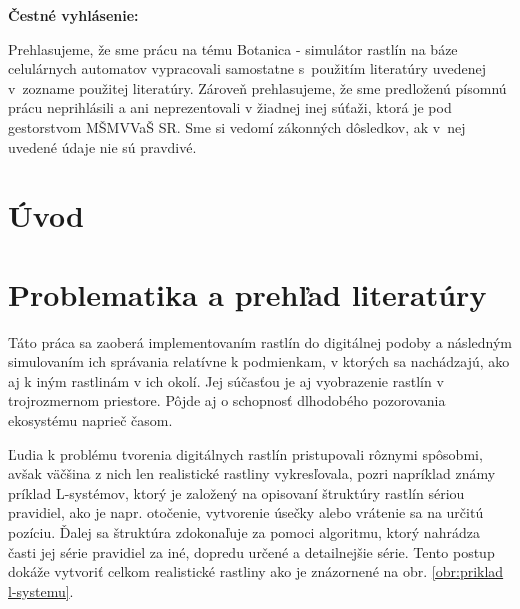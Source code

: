 \documentclass[12pt]{article}
\def\nazovprace{Botanica - simulátor rastlín na báze celulárnych automatov}
\begin{document}
\setcounter{page}{3}

%
%

\thispagestyle{empty}

\null
\vspace{4cm}

\noindent
\textbf{Čestné vyhlásenie:}

\noindent
Prehlasujeme, že sme prácu na tému
\nazovprace \space
vypracovali samostatne s~použitím literatúry uvedenej v~zozname použitej literatúry.
Zároveň prehlasujeme, že sme predloženú písomnú prácu neprihlásili a ani neprezentovali
v žiadnej inej súťaži, ktorá je pod gestorstvom MŠMVVaŠ SR. Sme si vedomí zákonných dôsledkov,
ak v~nej uvedené údaje nie sú pravdivé.

\newpage


%
%

% 
% 
% 
% 


%
%

\thispagestyle{empty}
\tableofcontents

%
%

\section*{Úvod}

\section{Problematika a prehľad literatúry}

Táto práca sa zaoberá implementovaním rastlín do digitálnej podoby a následným
simulovaním ich správania relatívne k podmienkam, v ktorých sa nachádzajú,
ako aj k iným rastlinám v ich okolí. Jej súčasťou je aj vyobrazenie
rastlín v trojrozmernom priestore. Pôjde aj o schopnosť dlhodobého
pozorovania ekosystému naprieč časom.

Ľudia k problému tvorenia digitálnych rastlín pristupovali rôznymi spôsobmi,
avšak väčšina z nich len realistické rastliny vykresľovala, pozri napríklad
známy príklad L-systémov, \cite{wiki:L-system}
ktorý je založený na opisovaní štruktúry rastlín
sériou pravidiel, ako je napr. otočenie, vytvorenie úsečky alebo
vrátenie sa na určitú pozíciu. Ďalej sa štruktúra zdokonaľuje za pomoci
algoritmu, ktorý nahrádza časti jej série pravidiel za iné, dopredu určené
a detailnejšie série. Tento postup dokáže vytvoriť celkom realistické rastliny
ako je znázornené na obr. \ref{obr:priklad l-systemu}.
\end{document}
